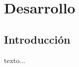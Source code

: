 \chapter[Desarrollo]{\label{ch:desarrollo}Desarrollo}

\section{\label{sec:des-intro}Introducción}

texto...













